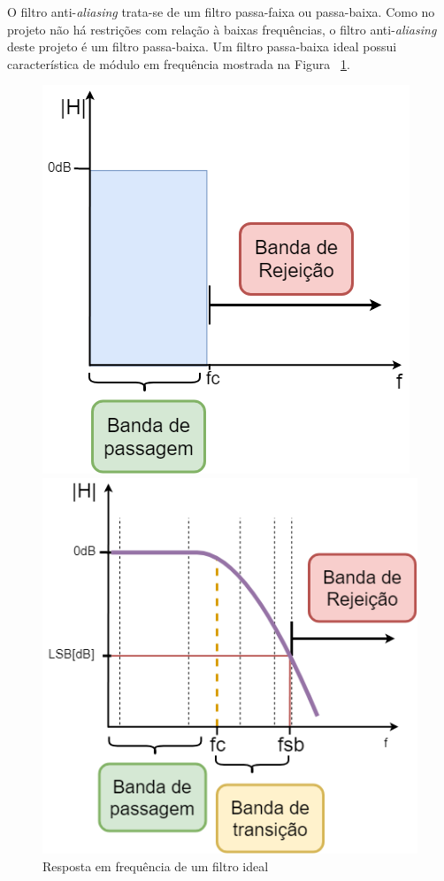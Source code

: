 \documentclass[11pt]{abntex2}
\begin{document}
				\pagebreak

				O filtro anti-\textit{aliasing} trata-se de um filtro passa-faixa
				ou passa-baixa. Como no projeto não há restrições com relação à
				baixas frequências, o filtro anti-\textit{aliasing} deste projeto
				é um filtro passa-baixa. Um filtro passa-baixa ideal possui
				característica de módulo em frequência mostrada na Figura ~\ref{fig:filtroIdeal}.

				\begin{figure}[!ht]
					\centering
					\begin{minipage}{.4\linewidth}
						\centering
						\includegraphics[width=.8\linewidth]{../../Fotos/Diagramas/sinalFaaADC/filtroIdeal.png}
						\caption{Resposta em frequência de um filtro ideal}
						\label{fig:filtroIdeal}
					\end{minipage}
					\hfill\vline\hfill
					\begin{minipage}{.4\linewidth}
						\centering
						\includegraphics[width=\linewidth]{../../Fotos/Diagramas/sinalFaaADC/filtroReal.png}

\end{minipage}
\end{figure}
\end{document}
